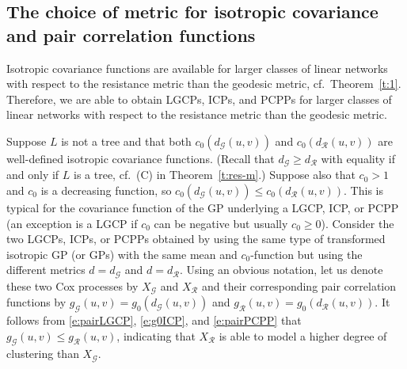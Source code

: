 \documentclass[alpha-refs]{wiley-article}
\begin{document}
\subsection{The choice of metric for isotropic covariance and pair correlation functions}\label{s:7.2}

Isotropic covariance functions are available for larger classes of linear networks with respect to the resistance metric than the geodesic metric, cf.\ Theorem~\ref{t:1}. Therefore, we are able to obtain LGCPs, ICPs, and PCPPs for larger classes of linear networks with respect to the resistance metric than the geodesic metric.

Suppose $L$ is not a tree and that both $c_0(d_{\mathcal G}(u,v))$ and $c_0(d_{\mathcal R}(u,v))$ are well-defined isotropic covariance functions.
(Recall that $d_{\mathcal G}\ge d_{\mathcal R}$ with equality if and only if $L$ is a tree, cf.\ (C) in Theorem~\ref{t:res-m}.) 
Suppose also that $c_0> 1$ and $c_0$ is a decreasing function, so $c_0(d_{\mathcal G}(u,v))\le c_0(d_{\mathcal R}(u,v))$. This is 
typical for the covariance function of the GP underlying a LGCP, ICP, or PCPP
(an exception is a LGCP if $c_0$ can be negative but usually {$c_0\ge0$}). Consider the two LGCPs, ICPs, or PCPPs obtained by using the same type of transformed isotropic GP (or GPs) with the same mean and $c_0$-function but using the different metrics $d=d_{\mathcal G}$ and $d=d_{\mathcal R}$. Using an obvious notation, let us denote 
these two Cox processes by $X_{\mathcal G}$ and $X_{\mathcal R}$ and their corresponding pair correlation functions by 
$g_{\mathcal G}(u,v)=g_0(d_{\mathcal G}(u,v))$ and $g_{\mathcal R}(u,v)=g_0(d_{\mathcal R}(u,v))$. It follows from \eqref{e:pairLGCP}, \eqref{e:g0ICP}, and \eqref{e:pairPCPP} that   
 {$g_{\mathcal G}(u,v)\le g_{\mathcal R}(u,v)$}, indicating that $X_{\mathcal R}$ is able to model a higher degree of clustering than  
 $X_{\mathcal G}$.
 
%
%
\end{document}
